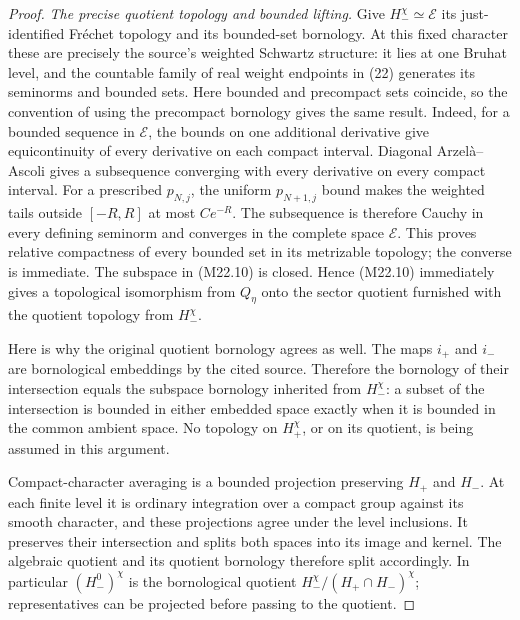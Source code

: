 \documentclass[11pt,a4paper]{article}
\begin{document}
\begin{proof}
\emph{The precise quotient topology and bounded lifting.}
Give \(H_-^\chi\simeq\mathcal E\) its
just-identified Fr\'echet topology and its
bounded-set bornology.  At this fixed character
these are precisely the source's weighted
Schwartz structure: it lies at one Bruhat
level, and the countable family of real
weight endpoints in (22) generates its
seminorms and bounded sets.
Here bounded and precompact sets coincide,
so the convention of using the precompact
bornology gives the same result.  Indeed,
for a bounded sequence in \(\mathcal E\),
the bounds on one additional derivative
give equicontinuity of every derivative
on each compact interval.  Diagonal
Arzel\`a--Ascoli gives a subsequence
converging with every derivative on every
compact interval.  For a prescribed
\(p_{N,j}\), the uniform \(p_{N+1,j}\)
bound makes the weighted tails outside
\([-R,R]\) at most \(Ce^{-R}\).
The subsequence is therefore Cauchy in
every defining seminorm and converges
in the complete space \(\mathcal E\).
This proves relative compactness of every
bounded set in its metrizable topology;
the converse is immediate.
The subspace in (M22.10) is closed.
Hence (M22.10) immediately gives a
topological isomorphism from \(Q_\eta\)
onto the sector quotient furnished with
the quotient topology from \(H_-^\chi\).

Here is why the original quotient bornology
agrees as well.  The maps \(i_+\) and \(i_-\)
are bornological embeddings by the cited
source.  Therefore the bornology of their
intersection equals the subspace bornology
inherited from \(H_-^\chi\): a subset of the
intersection is bounded in either embedded
space exactly when it is bounded in the
common ambient space.  No topology on
\(H_+^\chi\), or on its quotient, is being
assumed in this argument.

Compact-character averaging is a bounded
projection preserving \(H_+\) and \(H_-\).
At each finite level it is ordinary integration
over a compact group against its smooth
character, and these projections agree under
the level inclusions.
It preserves their intersection and splits
both spaces into its image and kernel.
The algebraic quotient and its quotient
bornology therefore split accordingly.
In particular \((H_-^0)^\chi\) is the
bornological quotient
\(H_-^\chi/(H_+\cap H_-)^\chi\);
representatives can be projected before
passing to the quotient.


\end{proof}
\end{document}
